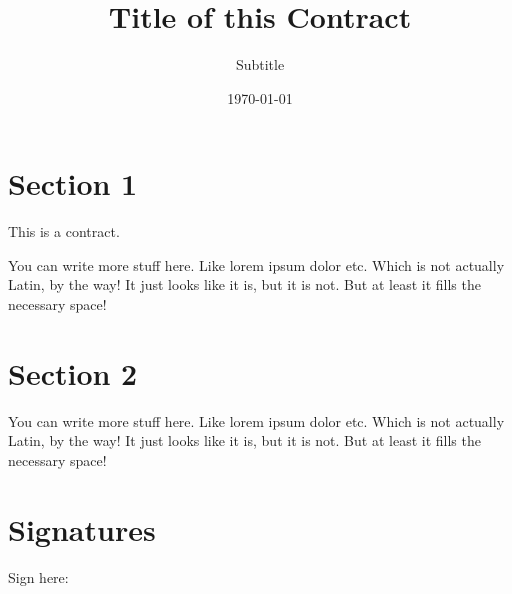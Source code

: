 \documentclass[11pt,enlargefirstpage=true,headlines=4]{scrartcl}
\title{Title of this Contract}
\subtitle{Subtitle}
\date{\today} %
\begin{document}
	\maketitle

	\section{Section 1}

	This is a contract.

	You can write more stuff here. Like lorem ipsum dolor etc. Which is not
	actually Latin, by the way! It just looks like it is, but it is not. But at
	least it fills the necessary space!

	\section{Section 2}

	You can write more stuff here. Like lorem ipsum dolor etc. Which is not
	actually Latin, by the way! It just looks like it is, but it is not. But at
	least it fills the necessary space!

	\section{Signatures}

  Sign here:

	\quad
\end{document}
